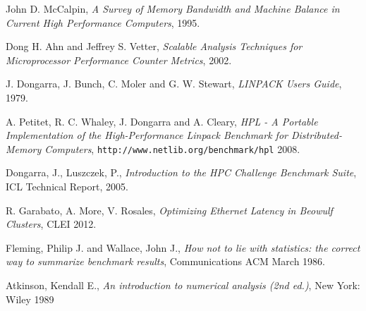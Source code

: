 \documentclass[a4paper]{report}
\begin{document}
\begin{thebibliography}{9}
  John D. McCalpin,
  \emph{A Survey of Memory Bandwidth and Machine Balance in Current High
    Performance Computers},
  1995.
  
  Dong H. Ahn and Jeffrey S. Vetter,
  \emph{Scalable Analysis Techniques for Microprocessor Performance Counter
    Metrics},
  2002.
  
  J. Dongarra, J. Bunch, C. Moler and G. W. Stewart, 
  \emph{LINPACK Users Guide},
  1979.
  
  A. Petitet, R. C. Whaley, J. Dongarra and A. Cleary, 
  \emph{HPL - A Portable Implementation of the High-Performance Linpack
    Benchmark for Distributed-Memory Computers}, {\tt http://www.netlib.org/benchmark/hpl}
  2008.

  Dongarra, J., Luszczek, P.,
  \emph{Introduction to the HPC Challenge Benchmark Suite}, ICL Technical Report,
  2005.  
  
	R. Garabato, A. More, V. Rosales,
	\emph{Optimizing Ethernet Latency in Beowulf Clusters},
	CLEI 2012.

	Fleming, Philip J. and Wallace, John J.,
	\emph{How not to lie with statistics: the correct way to summarize benchmark results},
	Communications ACM March 1986.

	Atkinson, Kendall E.,
	\emph{An introduction to numerical analysis (2nd ed.)},
	New York: Wiley 1989

\end{thebibliography}
\end{document}
